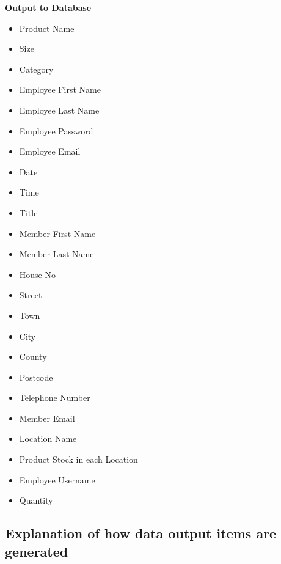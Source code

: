 \textbf{Output to Database}
\begin{itemize}
\item Product Name
\item Size
\item Category
\item Employee First Name
\item Employee Last Name
\item Employee Password
\item Employee Email
\item Date
\item Time
\item Title
\item Member First Name
\item Member Last Name
\item House No
\item Street
\item Town
\item City
\item County
\item Postcode
\item Telephone Number
\item Member Email
\item Location Name
\item Product Stock in each Location
\item Employee Username
\item Quantity
\end{itemize}
\subsection{Explanation of how data output items are generated}

